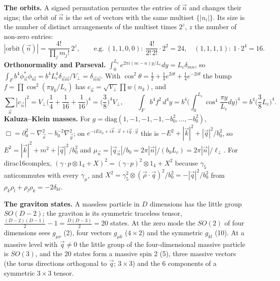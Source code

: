 \documentclass[10pt,a4paper]{article}
\begin{document}
\textbf{The orbits.} A signed permutation permutes the entries of $\vec n$ and changes their signs; the orbit of $\vec n$ is the set of vectors with the same multiset $\{|n_i|\}$. Its size is the number of distinct arrangements of the multiset times $2^{z}$, $z$ the number of non-zero entries:
\begin{equation*}
|\text{orbit}(\vec n)|=\frac{4!}{\prod_jm_j!}\,2^{z},\qquad\text{e.g. }(1,1,0,0):\ \frac{4!}{2!\,2!}\cdot2^2=24,\quad (1,1,1,1):\ 1\cdot2^4=16 .
\end{equation*}
\textbf{Orthonormality and Parseval.} $\int_0^{L_c}e^{2\pi i(m-n)y/L_c}dy=L_c\delta_{mn}$, so $\int_Fb^4\phi^*_{\vec n}\phi_{\vec m}=b^4L_c^4\delta_{\vec n\vec m}/V_\perp=\delta_{\vec n\vec m}$. With $\cos^2\theta=\frac12+\frac14e^{2i\theta}+\frac14e^{-2i\theta}$ the bump $f=\prod\cos^2(\pi y_k/L_c)$ has $c_{\vec n}=\sqrt{V_\perp}\prod w(n_k)$, and
\begin{equation*}
\sum_{\vec n}|c_{\vec n}|^2=V_\perp\Big(\frac14+\frac1{16}+\frac1{16}\Big)^4=\Big(\frac38\Big)^4V_\perp,\qquad \int_Fb^4f^2\,d^4y=b^4\Big(\int_0^{L_c}\cos^4\frac{\pi y}{L_c}dy\Big)^4=b^4\Big(\frac38L_c\Big)^4 .
\end{equation*}
\textbf{Kaluza–Klein masses.} For $g=\mathrm{diag}(1,-1,-1,-1,-b_0^2,\dots,-b_0^2)$, $\Box=\partial_0^2-\nabla_{\vec x}^2-b_0^{-2}\nabla_{\vec y}^2$; on $e^{-iEx_0+i\vec k\cdot\vec x+i\vec q\cdot\vec y}$ this is $-E^2+|\vec k|^2+|\vec q|^2/b_0^2$, so $E^2=|\vec k|^2+m^2+|\vec q|^2/b_0^2$ and $\mu_{\vec n}=|\vec q_{\vec n}|/b_0=2\pi|\vec n|/(b_0L_c)=2\pi|\vec n|/\ell_\perp$. For dirac16complex, $(\gamma\cdot p\otimes1_4+X)^2=(\gamma\cdot p)^2\otimes1_4+X^2$ because $\gamma_5$ anticommutes with every $\gamma_\mu$, and $X^2=\gamma_5^2\otimes(\vec\rho\cdot\vec q)^2/b_0^2=-|\vec q|^2/b_0^2$ from $\rho_k\rho_l+\rho_l\rho_k=-2\delta_{kl}$.

\textbf{The graviton states.} A massless particle in $D$ dimensions has the little group $SO(D-2)$; the graviton is its symmetric traceless tensor, $\frac{(D-2)(D-1)}2-1=\frac{D(D-3)}2=20$ states. At the zero mode the $SO(2)$ of four dimensions sees $g_{\mu\nu}$ (2), four vectors $g_{\mu k}$ ($4\times2$) and the symmetric $g_{kl}$ (10). At a massive level with $\vec q\ne0$ the little group of the four-dimensional massive particle is $SO(3)$, and the 20 states form a massive spin 2 (5), three massive vectors (the torus directions orthogonal to $\vec q$; $3\times3$) and the 6 components of a symmetric $3\times3$ tensor.
\end{document}
